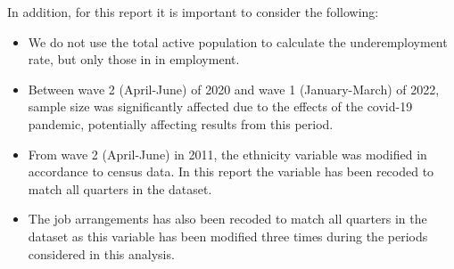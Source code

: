 \documentclass[
]{book}
\providecommand{\tightlist}{%
  \setlength{\itemsep}{0pt}\setlength{\parskip}{0pt}}
\begin{document}
In addition, for this report it is important to consider the following:

\begin{itemize}
\tightlist
\item
  We do not use the total active population to calculate the underemployment rate, but only those in in employment.
\item
  Between wave 2 (April-June) of 2020 and wave 1 (January-March) of 2022, sample size was significantly affected due to the effects of the covid-19 pandemic, potentially affecting results from this period.
\item
  From wave 2 (April-June) in 2011, the ethnicity variable was modified in accordance to census data. In this report the variable has been recoded to match all quarters in the dataset.
\item
  The job arrangements has also been recoded to match all quarters in the dataset as this variable has been modified three times during the periods considered in this analysis.
\end{itemize}
\end{document}
